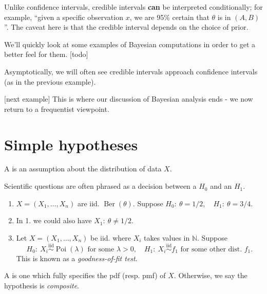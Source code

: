 \documentclass[egregdoesnotlikesansseriftitles,a4paper]{scrartcl}
\begin{document}
\begin{remark}
      Unlike confidence intervals, credible intervals \textbf{can} be interpreted conditionally; for example, ``given a specific observation $x$, we are 95\% certain that $\theta $ is in $(A,B)$''. The caveat here is that the credible interval depends on the choice of prior.
\end{remark}
We'll quickly look at some examples of Bayesian computations in order to get a better feel for them.
[todo]
\begin{remark}
      Asymptotically, we will often see credible intervals approach confidence intervals (as in the previous example).
\end{remark}
[next example]
This is where our discussion of Bayesian analysis ends - we now return to a frequentist viewpoint.
\section{Simple hypotheses}
\begin{definition*}[Hypothesis]
      A  is an assumption about the distribution of data $X$.
\end{definition*}
Scientific questions are often phrased as a decision between a  $H_0 $ and an  $H_1 $. 
\begin{example*}
      \begin{enumerate}
           \item $X = (X_1 ,\ldots,X_n)$ are iid. $\operatorname{Ber}(\theta )$. Suppose $H_0: \ \theta =1/2, \quad H_1 : \ \theta =3/4$.
           \item In 1. we could also have $X_1 :\ \theta \neq 1/2$.
           \item Let $X = (X_1 ,\ldots,X_n)$ be iid. where $X_i$ takes values in $\mathbb{N}$. Suppose \[
           H_0 : \ X_{i} \overset{\operatorname{iid}}{\sim} \operatorname{Poi}(\lambda ) \text{ for some } \lambda >0, \quad H_1 : \ X_{i} \overset{\operatorname{iid}}{\sim} f_{1} \text{ for some other dist. } f_{1}
           .\] This is known as a \emph{goodness-of-fit test}.
      \end{enumerate}
\end{example*}
\begin{definition*}
      A  is one which fully specifies the pdf (resp. pmf) of $X$. Otherwise, we say the hypothesis is \emph{composite}.
\end{definition*}
\end{document}
